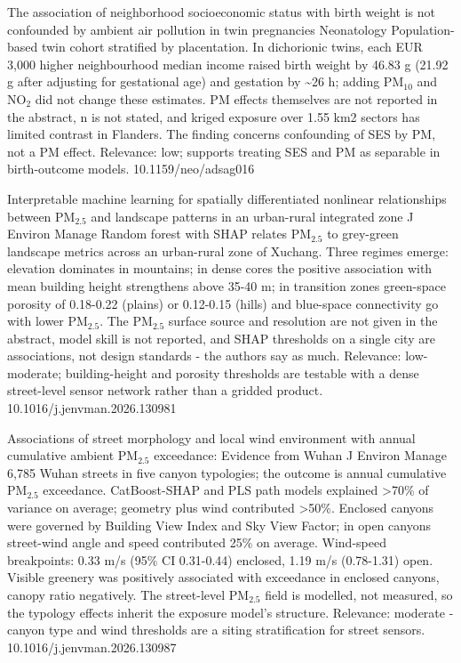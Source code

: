 \documentclass[10pt]{article}
\begin{document}
{The association of neighborhood socioeconomic status with birth weight is not confounded by ambient air pollution in twin pregnancies}
{Neonatology}
{Population-based twin cohort stratified by placentation. In dichorionic twins, each EUR 3,000 higher neighbourhood median income raised birth weight by 46.83 g (21.92 g after adjusting for gestational age) and gestation by \textasciitilde{}26 h; adding PM$_{10}$ and NO$_2$ did not change these estimates. PM effects themselves are not reported in the abstract, n is not stated, and kriged exposure over 1.55 km2 sectors has limited contrast in Flanders. The finding concerns confounding of SES by PM, not a PM effect. Relevance: low; supports treating SES and PM as separable in birth-outcome models.}
{10.1159/neo/adsag016}

\par{}\baselineskip{}\baselineskip
{}

{Interpretable machine learning for spatially differentiated nonlinear relationships between PM$_{2.5}$ and landscape patterns in an urban-rural integrated zone}
{J Environ Manage}
{Random forest with SHAP relates PM$_{2.5}$ to grey-green landscape metrics across an urban-rural zone of Xuchang. Three regimes emerge: elevation dominates in mountains; in dense cores the positive association with mean building height strengthens above 35-40 m; in transition zones green-space porosity of 0.18-0.22 (plains) or 0.12-0.15 (hills) and blue-space connectivity go with lower PM$_{2.5}$. The PM$_{2.5}$ surface source and resolution are not given in the abstract, model skill is not reported, and SHAP thresholds on a single city are associations, not design standards - the authors say as much. Relevance: low-moderate; building-height and porosity thresholds are testable with a dense street-level sensor network rather than a gridded product.}
{10.1016/j.jenvman.2026.130981}

{Associations of street morphology and local wind environment with annual cumulative ambient PM$_{2.5}$ exceedance: Evidence from Wuhan}
{J Environ Manage}
{6,785 Wuhan streets in five canyon typologies; the outcome is annual cumulative PM$_{2.5}$ exceedance. CatBoost-SHAP and PLS path models explained >70\% of variance on average; geometry plus wind contributed >50\%. Enclosed canyons were governed by Building View Index and Sky View Factor; in open canyons street-wind angle and speed contributed 25\% on average. Wind-speed breakpoints: 0.33 m/s (95\% CI 0.31-0.44) enclosed, 1.19 m/s (0.78-1.31) open. Visible greenery was positively associated with exceedance in enclosed canyons, canopy ratio negatively. The street-level PM$_{2.5}$ field is modelled, not measured, so the typology effects inherit the exposure model's structure. Relevance: moderate - canyon type and wind thresholds are a siting stratification for street sensors.}
{10.1016/j.jenvman.2026.130987}
\end{document}
